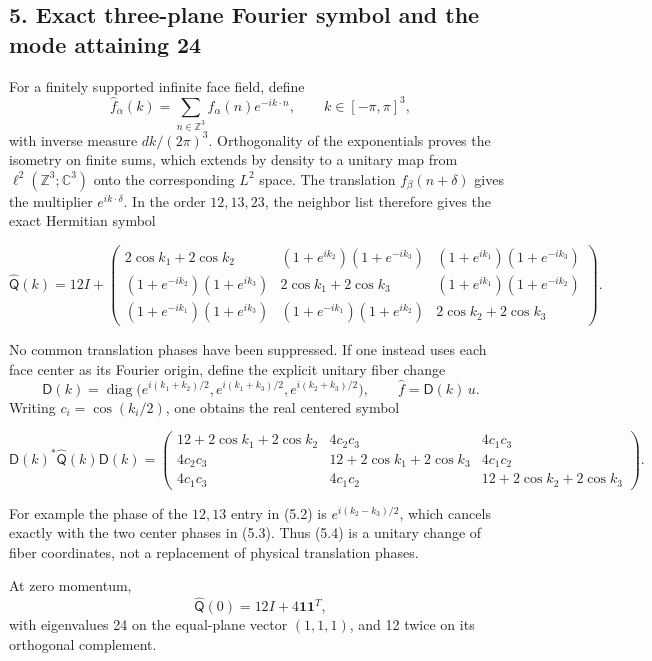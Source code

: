\documentclass[
  11pt,
]{article}
\begin{document}
\subsection{5. Exact three-plane Fourier symbol and the mode attaining
24}\label{magnetic-part-6-exact-three-plane-fourier-symbol-and-the-mode-attaining-24}

For a finitely supported infinite face field, define \[
\widehat f_\alpha(k)=\sum_{n\in\mathbb Z^3}f_\alpha(n)e^{-ik\cdot n},
\qquad k\in[-\pi,\pi]^3,
\tag{5.1}
\] with inverse measure \(dk/(2\pi)^3\). Orthogonality of the
exponentials proves the isometry on finite sums, which extends by
density to a unitary map from \(\ell^2(\mathbb Z^3;\mathbb C^3)\) onto
the corresponding \(L^2\) space. The translation \(f_\beta(n+\delta)\)
gives the multiplier \(e^{ik\cdot\delta}\). In the order \(12,13,23\),
the neighbor list therefore gives the exact Hermitian symbol

\[
\boxed{
\widehat{\mathsf Q}(k)=12I+
\begin{pmatrix}
2\cos k_1+2\cos k_2&
(1+e^{ik_2})(1+e^{-ik_3})&
(1+e^{ik_1})(1+e^{-ik_3})\\
(1+e^{-ik_2})(1+e^{ik_3})&
2\cos k_1+2\cos k_3&
(1+e^{ik_1})(1+e^{-ik_2})\\
(1+e^{-ik_1})(1+e^{ik_3})&
(1+e^{-ik_1})(1+e^{ik_2})&
2\cos k_2+2\cos k_3
\end{pmatrix}.}
\tag{5.2}
\]

No common translation phases have been suppressed. If one instead uses
each face center as its Fourier origin, define the explicit unitary
fiber change \[
\mathsf D(k)=\operatorname{diag}
\big(e^{i(k_1+k_2)/2},e^{i(k_1+k_3)/2},e^{i(k_2+k_3)/2}\big),
\qquad \widehat f=\mathsf D(k)\,u.
\tag{5.3}
\] Writing \(c_i=\cos(k_i/2)\), one obtains the real centered symbol

\[
\boxed{
\mathsf D(k)^*\widehat{\mathsf Q}(k)\mathsf D(k)
=
\begin{pmatrix}
12+2\cos k_1+2\cos k_2&4c_2c_3&4c_1c_3\\
4c_2c_3&12+2\cos k_1+2\cos k_3&4c_1c_2\\
4c_1c_3&4c_1c_2&12+2\cos k_2+2\cos k_3
\end{pmatrix}.}
\tag{5.4}
\]

For example the phase of the \(12,13\) entry in (5.2) is
\(e^{i(k_2-k_3)/2}\), which cancels exactly with the two center phases
in (5.3). Thus (5.4) is a unitary change of fiber coordinates, not a
replacement of physical translation phases.

At zero momentum, \[
\widehat{\mathsf Q}(0)=12I+4\mathbf1\mathbf1^T,
\tag{5.5}
\] with eigenvalues 24 on the equal-plane vector \((1,1,1)\), and 12
twice on its orthogonal complement.
\end{document}
